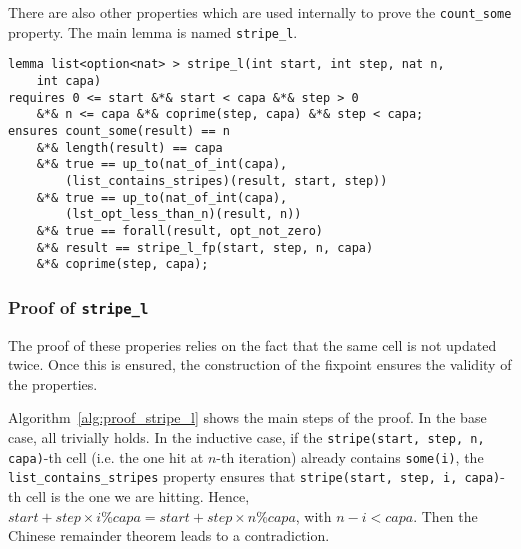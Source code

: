 \documentclass[oneside]{article}
\begin{document}
There are also other properties which are used internally to prove the \texttt{count\_some} property. The main lemma is named \texttt{stripe\_l}.

\begin{lemma}
	\begin{lstlisting}
lemma list<option<nat> > stripe_l(int start, int step, nat n, 
	int capa)
requires 0 <= start &*& start < capa &*& step > 0 
	&*& n <= capa &*& coprime(step, capa) &*& step < capa;
ensures count_some(result) == n
	&*& length(result) == capa
	&*& true == up_to(nat_of_int(capa), 
		(list_contains_stripes)(result, start, step))
	&*& true == up_to(nat_of_int(capa), 
		(lst_opt_less_than_n)(result, n))
	&*& true == forall(result, opt_not_zero)
	&*& result == stripe_l_fp(start, step, n, capa)
	&*& coprime(step, capa);
	\end{lstlisting}
\end{lemma}

\subsubsection{Proof of \texttt{stripe\_l}}
The proof of these properies relies on the fact that the same cell is not updated twice. Once this is ensured, the construction of the fixpoint ensures the validity of the properties. 

Algorithm~\ref{alg:proof_stripe_l} shows the main steps of the proof. In the base case, all trivially holds. In the inductive case, if the \texttt{stripe(start, step, n, capa)}-th cell (i.e. the one hit at $n$-th iteration) already contains \texttt{some(i)}, the \texttt{list\_contains\_stripes} property ensures that \texttt{stripe(start, step, i, capa)}-th cell is the one we are hitting. Hence, $start + step\times i \%capa = start + step\times n \%capa$, with $n-i < capa$. Then the Chinese remainder theorem leads to a contradiction.
\end{document}

